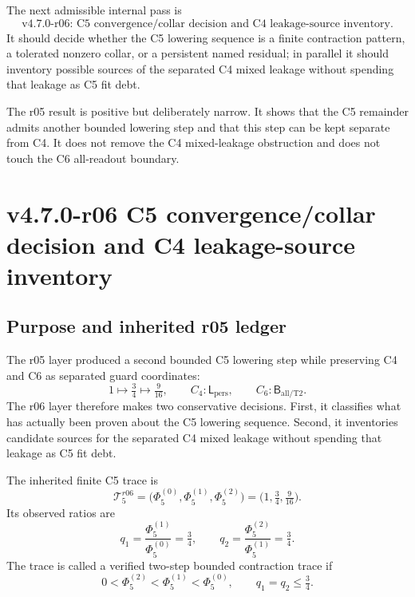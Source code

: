 \begin{corollary}
\label{cor:v470-r05-permitted-r06-direction}
The next admissible internal pass is
\[
\text{v4.7.0-r06: C5 convergence/collar decision and C4 leakage-source inventory.}
\]
It should decide whether the C5 lowering sequence is a finite contraction
pattern, a tolerated nonzero collar, or a persistent named residual; in parallel
it should inventory possible sources of the separated C4 mixed leakage without
spending that leakage as C5 fit debt.
\end{corollary}

\begin{remark}[r05 summary]
The r05 result is positive but deliberately narrow.  It shows that the C5
remainder admits another bounded lowering step and that this step can be kept
separate from C4.  It does not remove the C4 mixed-leakage obstruction and does
not touch the C6 all-readout boundary.
\end{remark}



\clearpage
\section{v4.7.0-r06 C5 convergence/collar decision and C4 leakage-source inventory}
\label{sec:v470-r06-c5-convergence-collar-c4-inventory}

\subsection{Purpose and inherited r05 ledger}
\label{subsec:v470-r06-purpose-inherited-ledger}

The r05 layer produced a second bounded C5 lowering step while preserving C4 and
C6 as separated guard coordinates:
\[
1 \longmapsto \tfrac34 \longmapsto \tfrac{9}{16},
\qquad
C_4:\mathsf L_{\mathrm{pers}},
\qquad
C_6:\mathsf B_{\mathrm{all/T2}}.
\]
The r06 layer therefore makes two conservative decisions.  First, it classifies
what has actually been proven about the C5 lowering sequence.  Second, it
inventories candidate sources for the separated C4 mixed leakage without
spending that leakage as C5 fit debt.

\begin{definition}
\label{def:v470-r06-c5-finite-lowering-trace}
The inherited finite C5 trace is
\[
\mathcal T_{5}^{r06}
=
\bigl(\Phi_5^{(0)},\Phi_5^{(1)},\Phi_5^{(2)}\bigr)
=
\bigl(1,\tfrac34,\tfrac{9}{16}\bigr).
\]
Its observed ratios are
\[
q_1=\frac{\Phi_5^{(1)}}{\Phi_5^{(0)}}=\tfrac34,
\qquad
q_2=\frac{\Phi_5^{(2)}}{\Phi_5^{(1)}}=\tfrac34.
\]
The trace is called a verified two-step bounded contraction trace if
\[
0<\Phi_5^{(2)}<\Phi_5^{(1)}<\Phi_5^{(0)},
\qquad
q_1=q_2\leq \tfrac34.
\]
\end{definition}

